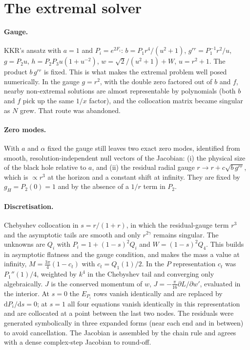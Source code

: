 \documentclass[11pt,a4paper]{article}
\begin{document}
\section{The extremal solver}

\paragraph{Gauge.} KKR's ansatz with $a=1$ and $P_i=e^{2F_i}$:
$b=P_1r^4/(u^2+1)$, $g^{rr}=P_1^{-1}r^2/u$, $g=P_2u$, $h=P_2P_3u(1+u^{-2})$,
$w=\sqrt2/(u^2+1)+W$, $u=r^2+1$. The product $b\,g^{rr}$ is fixed. This is what
makes the extremal problem well posed numerically. In the gauge $g=r^2$, with the
double zero factored out of $b$ and $f$, nearby non-extremal solutions are almost
representable by polynomials (both $b$ and $f$ pick up the same $1/x$ factor), and
the collocation matrix became singular as $N$ grew. That route was abandoned.

\paragraph{Zero modes.} With $a$ and $\alpha$ fixed the gauge still leaves two
exact zero modes, identified from smooth, resolution-independent null vectors of
the Jacobian: (i) the physical size of the black hole relative to $a$, and (ii)
the residual radial gauge $r\to r+c\sqrt{b\,g^{rr}}$, which is $\propto r^3$ at
the horizon and a constant shift at infinity. They are fixed by $g_H=P_2(0)=1$
and by the absence of a $1/r$ term in $P_2$.

\paragraph{Discretisation.} Chebyshev collocation in $s=r/(1+r)$, in which the
residual-gauge term $r^3$ and the asymptotic tails are smooth and only
$r^{2\gamma}$ remains singular. The unknowns are $Q_i$ with
$P_i=1+(1-s)^2Q_i$ and $W=(1-s)^2Q_4$. This builds in asymptotic flatness and the
gauge condition, and makes the mass a value at infinity,
$M=\tfrac{3\pi}{4}(1-c_t)$ with $c_t=Q_1(1)/2$. In the $P$ representation $c_t$
was $P_1''(1)/4$, weighted by $k^4$ in the Chebyshev tail and converging only
algebraically. $J$ is the conserved momentum of $w$, $J=-\tfrac{\pi}{16}\partial
L/\partial w'$, evaluated in the interior. At $s=0$ the $E_{P_i}$ rows vanish
identically and are replaced by $\mathrm dP_i/\mathrm ds=0$; at $s=1$ all four
equations vanish identically in this representation and are collocated at a point
between the last two nodes. The residuals were generated symbolically in three
expanded forms (near each end and in between) to avoid cancellation. The Jacobian
is assembled by the chain rule and agrees with a dense complex-step Jacobian to
round-off.
\end{document}
